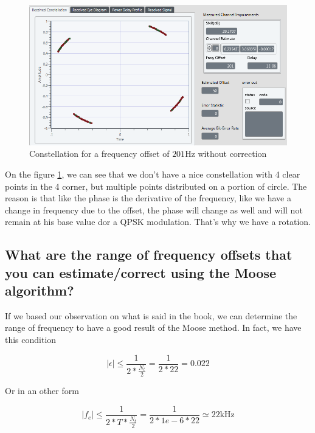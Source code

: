 \documentclass[frenchb, oneside, headings=normal]{scrartcl}
\begin{document}
\begin{figure}[!ht]
\centering
\includegraphics[scale=0.7]{img/test_offset_201hz_OFF.PNG}
\caption{Constellation for a frequency offset of $201 \si{\hertz}$ without correction}
\label{freq_correct_off}
\end{figure}

On the figure \ref{freq_correct_off}, we can see  that we don't have a nice constellation with 4 clear points in the 4 corner, but multiple points distributed on a portion of circle. The reason is that like the phase is the derivative of the frequency, like we have a change in frequency due to the offset, the phase will change as well and will not remain at his base value dor a QPSK modulation. That's why we have a rotation.

\subsection{What are the range of frequency offsets that you can estimate/correct using the Moose algorithm?}

If we based our observation on what is said in the book, we can determine the range of frequency to have a good result of the Moose method. In fact, we have this condition

\begin{equation}
|\epsilon| \leq \frac{1}{2*\frac{N_t}{2}} = \frac{1}{2*22} = 0.022
\label{cdt1}
\end{equation}

Or in an other form 

\begin{equation}
|f_e| \leq \frac{1}{2*T*\frac{N_t}{2}} = \frac{1}{2*1e-6*22} \simeq 22 \si{\kilo\hertz}
\label{cdt2}
\end{equation}\\
\end{document}
